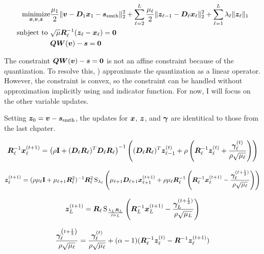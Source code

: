 \begin{equation}
\begin{aligned}
\operatorname*{\text{minimize}}_{\bm{x},\bm{v},\bm{z}} & \frac{\mu_1}{2}\|\bm{v} - \bm{D}_1\bm{x}_1  - \bm{s}_{\text{smth}}\|_2^2 + \sum_{\ell = 2}^L \frac{\mu_{\ell}}{2}\|\bm{z}_{\ell - 1} - \bm{D}_{\ell}\bm{x}_{\ell}\|_2^2 + \sum_{\ell = 1}^L \lambda_{\ell}\|\bm{z}_{\ell}\|_1 \\
\text{subject to } & \sqrt{\mu}\bm{R}_{\ell}^{-1}(\bm{z}_{\ell} - \bm{x}_{\ell}) = \bm{0} \\
                   & \bm{Q}\bm{W}(\bm{v}) - \bm{s} = \bm{0}
\end{aligned}
\end{equation}

The constraint $\bm{Q}\bm{W}(\bm{v}) - \bm{s} = \bm{0}$ is not an affine constraint because of the quantization. To resolve this, \cite{chodosh2020use}) approximate the quantization as a linear operator. However, the constraint is convex, so the constraint can be handled without approximation implicitly using and indicator function. For now, I will focus on the other variable updates.

Setting $\bm{z}_0 = \bm{v} - \bm{s}_{\text{smth}}$, the updates for $\bm{x}$, $\bm{z}$, and $\bm{\gamma}$ are identitical to those from the last chpater.

\begin{equation}
\bm{R}_{\ell}^{-1}\bm{x}_{\ell}^{(t + 1)} = \left(\rho {\bf I} + (\bm{D}_{\ell}\bm{R}_{\ell})^T\bm{D}_{\ell}\bm{R}_{\ell}\right)^{-1}\left((\bm{D}_{\ell}\bm{R}_{\ell})^T\bm{z}_{\ell - 1}^{(t)} + \rho \left(\bm{R}_{\ell}^{-1}\bm{z}_{\ell}^{(t)} + \frac{\bm{\gamma}_{\ell}^{(t)}}{\rho\sqrt{\mu_{\ell}}}\right)\right)
\end{equation}

\begin{equation}
\bm{z}_{\ell}^{(t + 1)} = (\rho\mu_{\ell}{\bf I} + \mu_{\ell + 1}\bm{R}_{\ell}^2)^{-1}\bm{R}_{\ell}^2\operatorname{S}_{\lambda_{\ell}}\left(\mu_{\ell + 1}\bm{D}_{\ell + 1}\bm{x}_{\ell + 1}^{(t + 1)} + \rho\mu_{\ell}\bm{R}_{\ell}^{-1}\left(\bm{R}_{\ell}^{-1}\bm{x}_{\ell}^{(t + 1)} - \frac{\bm{\gamma}_{\ell}^{(t + \frac{1}{2})}}{\rho\sqrt{\mu_{\ell}}}\right)\right)
\end{equation}

\begin{equation}
\bm{z}_L^{(t + 1)} = \bm{R}_{\ell}\operatorname{S}_{\frac{\lambda_L\bm{R}_L}{\rho\mu_L}}\left(\bm{R}_L^{-1}\bm{x}_L^{(t + 1)} - \frac{\bm{\gamma}_L^{(t + \frac{1}{2})}}{\rho\sqrt{\mu_L}}\right)
\end{equation}

\begin{equation}
\frac{\bm{\gamma}_{\ell}^{\left(t + \frac{1}{2}\right)}}{\rho\sqrt{\mu_{\ell}}} = \frac{\bm{\gamma}_{\ell}^{(t)}}{\rho\sqrt{\mu_{\ell}}} + (\alpha - 1)(\bm{R}_{\ell}^{-1}\bm{z}_{\ell}^{(t)} - \bm{R}^{-1}\bm{z}_{\ell}^{(t + 1)})
\end{equation}


